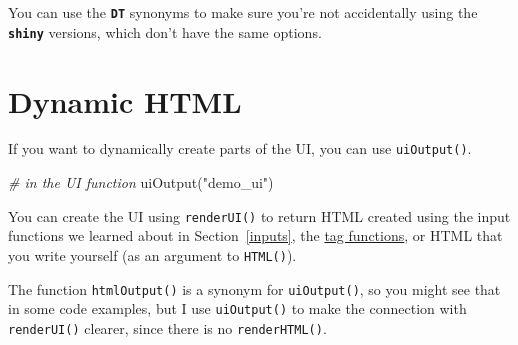\documentclass[
  oneside]{book}
\newenvironment{Shaded}{\begin{snugshade}}{\end{snugshade}}
\newcommand{\CommentTok}[1]{\textcolor[rgb]{0.56,0.35,0.01}{\textit{#1}}}
\newcommand{\DecValTok}[1]{\textcolor[rgb]{0.00,0.00,0.81}{#1}}
\newcommand{\FunctionTok}[1]{\textcolor[rgb]{0.00,0.00,0.00}{#1}}
\newcommand{\NormalTok}[1]{#1}
\newcommand{\OtherTok}[1]{\textcolor[rgb]{0.56,0.35,0.01}{#1}}
\newcommand{\SpecialCharTok}[1]{\textcolor[rgb]{0.00,0.00,0.00}{#1}}
\newcommand{\StringTok}[1]{\textcolor[rgb]{0.31,0.60,0.02}{#1}}
\begin{document}
\begin{info}
You can use the \textbf{\texttt{DT}} synonyms to make sure you're not accidentally using the \textbf{\texttt{shiny}} versions, which don't have the same options.

\end{info}

\hypertarget{dynamic-html}{%
\section{Dynamic HTML}\label{dynamic-html}}

If you want to dynamically create parts of the UI, you can use \texttt{uiOutput}\texttt{()}.

\begin{Shaded}
\begin{Highlighting}[]
\CommentTok{\# in the UI function}
\FunctionTok{uiOutput}\NormalTok{(}\StringTok{"demo\_ui"}\NormalTok{)}
\end{Highlighting}
\end{Shaded}

You can create the UI using \texttt{renderUI}\texttt{()} to return HTML created using the input functions we learned about in Section~\ref{inputs}, the \protect\hyperlink{tags}{tag functions}, or HTML that you write yourself (as an argument to \texttt{HTML}\texttt{()}).

\begin{Shaded}
\end{Shaded}

\begin{info}
The function \texttt{htmlOutput}\texttt{()} is a synonym for \texttt{uiOutput}\texttt{()}, so you might see that in some code examples, but I use \texttt{uiOutput}\texttt{()} to make the connection with \texttt{renderUI}\texttt{()} clearer, since there is no \texttt{renderHTML}\texttt{()}.

\end{info}
\end{document}
